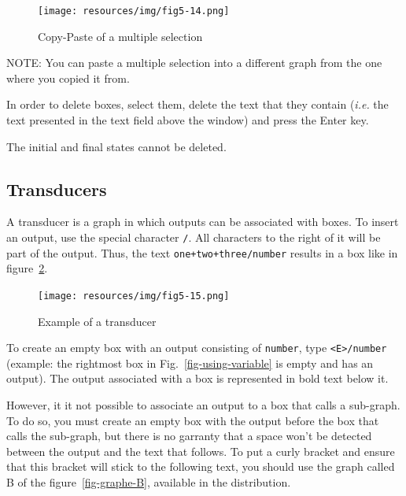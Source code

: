 \begin{figure}[!ht]
\begin{center}
\texttt{[image: resources/img/fig5-14.png]}
\caption{Copy-Paste of a multiple selection\label{copy-paste-multi-selection}}
\end{center}
\end{figure}

\bigskip
\noindent NOTE: You can paste a multiple selection into a different graph from
the one where you copied it from.

\bigskip
{}
\noindent In order to delete boxes, select them, delete the text that they
contain (\textit{i.e.} the text presented in the text field above the window)
and press the Enter key.

\bigskip
\noindent The initial and final states cannot be deleted.

\subsection{Transducers}
\label{Transducers}\index{\verbc{/}}
A transducer is a graph in which outputs can be associated with boxes. To insert
an output, use the special character \verb+/+. All characters to the right of
it will be part of the output. Thus, the text \verb$one+two+three/number$ results in
a box like in figure~\ref{fig-exemple-transduction}.

\begin{figure}[!ht]
\begin{center}
\texttt{[image: resources/img/fig5-15.png]}
\caption{Example of a transducer\label{fig-exemple-transduction}}
\end{center}
\end{figure}

\noindent To create an empty box with an output consisting of \verb+number+, type \verb+<E>/number+ (example: the rightmost box in Fig.~\ref{fig-using-variable} is empty and has an output). The output associated with a box is represented in bold text below it.


\bigskip
\noindent However, it it not possible to associate an output to a box that calls a sub-graph. To do so, you must create an empty box with the output before the box that calls the sub-graph, but there is no garranty that a space won't be detected between the output and the text that follows. To put a curly bracket and ensure that this bracket will stick to the following text, you should use the graph called B of the figure~\ref{fig-graphe-B}, available in the distribution.

